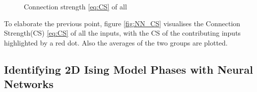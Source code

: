 \begin{figure}[H]
\qquad
{}
\caption{Connection strength \autoref{eq:CS} of all }
\label{fig:NN_reg}
\end{figure}

To elaborate the previous point, figure \autoref{fig:NN_CS} visualises the Connection Strength(CS) \autoref{eq:CS} of all the inputs, with the CS of the contributing inputs highlighted by a red dot. Also the averages of the two groups are plotted. 







\subsection{Identifying 2D Ising Model Phases with Neural Networks}\label{sec:results NN reg}

